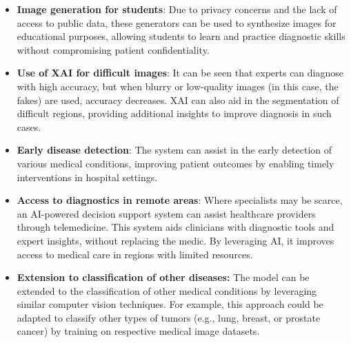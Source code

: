 \begin{itemize}
    \item \textbf{Image generation for students}: Due to privacy concerns and the lack of access to public data, these generators can be used to synthesize images for educational purposes, allowing students to learn and practice diagnostic skills without compromising patient confidentiality. 
    
    \item \textbf{Use of XAI for difficult images}: It can be seen that experts can diagnose with high accuracy, but when blurry or low-quality images (in this case, the fakes) are used, accuracy decreases. XAI can also aid in the segmentation of difficult regions, providing additional insights to improve diagnosis in such cases.

    \item \textbf{Early disease detection}: The system can assist in the early detection of various medical conditions, improving patient outcomes by enabling timely interventions in hospital settings.

    \item \textbf{Access to diagnostics in remote areas}: Where specialists may be scarce, an AI-powered decision support system can assist healthcare providers through telemedicine. This system aids clinicians with diagnostic tools and expert insights, without replacing the medic. By leveraging AI, it improves access to medical care in regions with limited resources.

    \item \textbf{Extension to classification of other diseases:} 
    The model can be extended to the classification of other medical conditions by leveraging similar computer vision techniques. For example, this approach could be adapted to classify other types of tumors (e.g., lung, breast, or prostate cancer) by training on respective medical image datasets.

\end{itemize}


